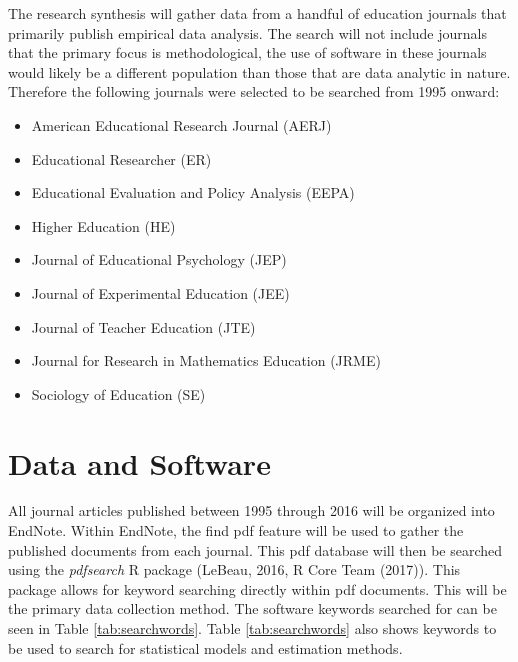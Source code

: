 \documentclass[english,floatsintext,man]{apa6}
\providecommand{\tightlist}{%
  \setlength{\itemsep}{0pt}\setlength{\parskip}{0pt}}
\theoremstyle{definition}
\theoremstyle{definition}
\theoremstyle{remark}
\begin{document}
The research synthesis will gather data from a handful of education
journals that primarily publish empirical data analysis. The search will
not include journals that the primary focus is methodological, the use
of software in these journals would likely be a different population
than those that are data analytic in nature. Therefore the following
journals were selected to be searched from 1995 onward:

\begin{itemize}
\tightlist
\item
  American Educational Research Journal (AERJ)
\item
  Educational Researcher (ER)
\item
  Educational Evaluation and Policy Analysis (EEPA)
\item
  Higher Education (HE)
\item
  Journal of Educational Psychology (JEP)
\item
  Journal of Experimental Education (JEE)
\item
  Journal of Teacher Education (JTE)
\item
  Journal for Research in Mathematics Education (JRME)
\item
  Sociology of Education (SE)
\end{itemize}

\section{Data and Software}\label{data-and-software}

All journal articles published between 1995 through 2016 will be
organized into EndNote. Within EndNote, the find pdf feature will be
used to gather the published documents from each journal. This pdf
database will then be searched using the \emph{pdfsearch} R package
(LeBeau, 2016, R Core Team (2017)). This package allows for keyword
searching directly within pdf documents. This will be the primary data
collection method. The software keywords searched for can be seen in
Table \ref{tab:searchwords}. Table \ref{tab:searchwords} also shows
keywords to be used to search for statistical models and estimation
methods.
\end{document}
